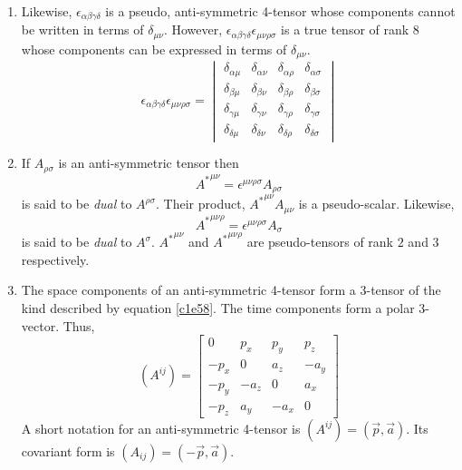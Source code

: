 \begin{enumerate}
\item Likewise, $\epsilon_{\alpha\beta\gamma\delta}$ is a pseudo, anti-symmetric
4-tensor whose components cannot be written in terms of $\delta_{\mu\nu}$. However,
$\epsilon_{\alpha\beta\gamma\delta}\epsilon_{\mu\nu\rho\sigma}$ is a true tensor
of rank $8$ whose components can be expressed in terms of $\delta_{\mu\nu}$.
\begin{equation}\label{c1e61}
\epsilon_{\alpha\beta\gamma\delta}\epsilon_{\mu\nu\rho\sigma} = \begin{vmatrix}
\delta_{\alpha\mu} & \delta_{\alpha\nu} & \delta_{\alpha\rho} & \delta_{\alpha\sigma} \\
\delta_{\beta\mu} & \delta_{\beta\nu} & \delta_{\beta\rho} & \delta_{\beta\sigma} \\
\delta_{\gamma\mu} & \delta_{\gamma\nu} & \delta_{\gamma\rho} & \delta_{\gamma\sigma} \\
\delta_{\delta\mu} & \delta_{\delta\nu} & \delta_{\delta\rho} & \delta_{\delta\sigma}
\end{vmatrix}
\end{equation}

\item If $A_{\rho\sigma}$ is an anti-symmetric tensor then
\begin{equation}\label{c1e62}
{A^\ast}^{\mu\nu} = \epsilon^{\mu\nu\rho\sigma}A_{\rho\sigma}
\end{equation}
is said to be \emph{dual} to $A^{\rho\sigma}$. Their product, ${A^\ast}^{\mu\nu}
A_{\mu\nu}$ is a pseudo-scalar. Likewise, 
\begin{equation}\label{c1e63}
{A^\ast}^{\mu\nu\rho} = \epsilon^{\mu\nu\rho\sigma}A_{\sigma}
\end{equation}
is said to be \emph{dual} to $A^\sigma$. ${A^\ast}^{\mu\nu}$ and ${A^\ast}^{\mu\nu\rho}$
are pseudo-tensors of rank $2$ and $3$ respectively.

\item The space components of an anti-symmetric 4-tensor form a 3-tensor of the kind 
described by equation \eqref{c1e58}. The time components form a polar 3-vector. Thus,
\begin{equation}\label{c1e64}
(A^{ij}) = \begin{bmatrix} 0 & p_x & p_y & p_z \\
-p_x & 0 & a_z & -a_y \\
-p_y & -a_z & 0 & a_x \\
-p_z & a_y & -a_x & 0
\end{bmatrix}
\end{equation}
A short notation for an anti-symmetric 4-tensor is $(A^{ij}) = (\vec{p}, \vec{a})$.
Its covariant form is $(A_{ij}) = (-\vec{p}, \vec{a})$.


\end{enumerate}
